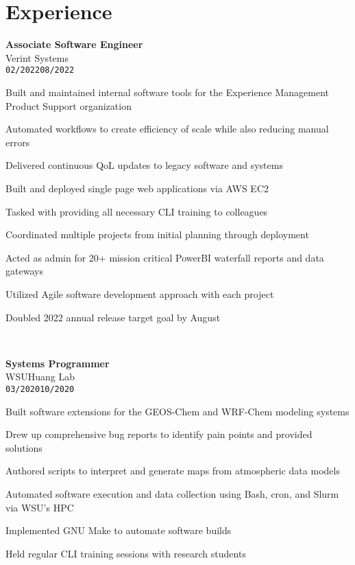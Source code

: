 \documentclass[11pt]{article}
\newenvironment{itemize*}%
  {\begin{itemize}[leftmargin=*,label=\faChevronRight]%
    \setlength{\itemsep}{0pt}%
    \setlength{\parskip}{0pt}%
    \setlength{\parsep}{0pt}}%
  {\end{itemize}}
\newcommand\workexp[5]{
    \hspace*{10pt}
    \begin{minipage}[t]{0.225\textwidth}
            \raggedleft
                \textbf{\fontsize{14}{10}\selectfont #1}\\ 
                #2\\
                \small\texttt{#3}\textendash \texttt{#4}
    \end{minipage}\hspace*{5pt}%
    \begin{minipage}[t]{0.7\textwidth}
        \raggedright
        \fontsize{10}{10}\selectfont#5
    \end{minipage}
}
\begin{document}
\section*{Experience}
\vspace*{-15pt}\workexp{Associate Software Engineer}{Verint Systems}{02/2022}{08/2022}{%
    \begin{itemize*}
        \item Built and maintained internal software tools for the Experience Management Product Support organization
        \item Automated workflows to create efficiency of scale while also reducing manual errors
        \item Delivered continuous QoL updates to legacy software and systems
        \item Built and deployed single page web applications via AWS EC2
        \item Tasked with providing all necessary CLI training to colleagues
        \item Coordinated multiple projects from initial planning through deployment
        \item Acted as admin for 20+ mission critical PowerBI waterfall reports and data gateways
        \item Utilized Agile software development approach with each project
        \item Doubled 2022 annual release target goal by August
    \end{itemize*}%
}
\vspace*{10pt}\\
\workexp{Systems Programmer}{WSU\textendash Huang Lab}{03/2020}{10/2020}{%
    \begin{itemize*}
        \item Built software extensions for the GEOS-Chem and WRF-Chem modeling systems
        \item Drew up comprehensive bug reports to identify pain points and provided solutions
        \item Authored scripts to interpret and generate maps from atmospheric data models
        \item Automated software execution and data collection using Bash, cron, and Slurm via WSU's HPC
        \item Implemented GNU Make to automate software builds
        \item Held regular CLI training sessions with research students
    \end{itemize*}%
}
\end{document}
